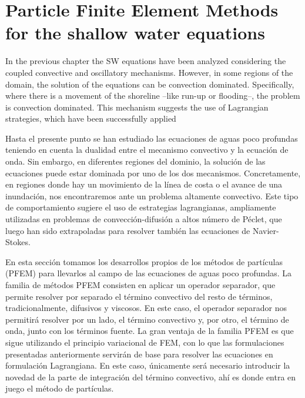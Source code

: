 
\chapter{Particle Finite Element Methods for the shallow water equations}
\label{lagrangian_sw}




In the previous chapter the SW equations have been analyzed considering the coupled convective and oscillatory mechanisms. However, in some regions of the domain, the solution of the equations can be convection dominated. Specifically, where there is a movement of the shoreline --like run-up or flooding--, the problem is convection dominated.
This mechanism suggests the use of Lagrangian strategies, which have been successfully applied




Hasta el presente punto se han estudiado las ecuaciones de aguas poco profundas teniendo en cuenta la dualidad entre el mecanismo convectivo y la ecuación de onda. Sin embargo, en diferentes regiones del dominio, la solución de las ecuaciones puede estar dominada por uno de los dos mecanismos. Concretamente, en regiones donde hay un movimiento de la línea de costa o el avance de una inundación, nos encontraremos ante un problema altamente convectivo. Este tipo de comportamiento sugiere el uso de estrategias lagrangianas, ampliamente utilizadas en problemas de convección-difusión a altos número de Péclet, que luego han sido extrapoladas para resolver también las ecuaciones de Navier-Stokes.

En esta sección tomamos los desarrollos propios de los métodos de partículas (PFEM) para llevarlos al campo de las ecuaciones de aguas poco profundas. La familia de métodos PFEM consisten en aplicar un operador separador, que permite resolver por separado el término convectivo del resto de términos, tradicionalmente, difusivos y viscosos. En este caso, el operador separador nos permitirá resolver por un lado, el término convectivo y, por otro, el término de onda, junto con los términos fuente. La gran ventaja de la familia PFEM es que sigue utilizando el principio variacional de FEM, con lo que las formulaciones presentadas anteriormente servirán de base para resolver las ecuaciones en formulación Lagrangiana. En este caso, únicamente será necesario introducir la novedad de la parte de integración del término convectivo, ahí es donde entra en juego el método de partículas.


